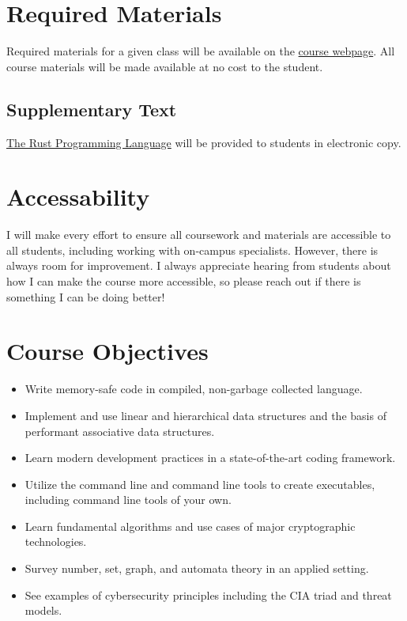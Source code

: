 \documentclass[11pt]{article}
\begin{document}
\section*{Required Materials}

Required materials for a given class will be available on the \href{https://cd-public.github.io/scicom}{course webpage}. All course materials will be made available at no cost to the student.

\subsection*{Supplementary Text}

\href{https://doc.rust-lang.org/book/}{The Rust Programming Language} will be provided to students in electronic copy.




\section*{Accessability}

I will make every effort to ensure all coursework and materials are accessible to all students, including working with on-campus specialists. However, there is always room for improvement. I always appreciate hearing from students about how I can make the course more accessible, so please reach out if there is something I can be doing better!


\section*{Course Objectives}

\begin{itemize}
\item Write memory-safe code in compiled, non-garbage collected language.
\item Implement and use linear and hierarchical data structures and the basis of performant associative data structures.
\item Learn modern development practices in a state-of-the-art coding framework.
\item Utilize the command line and command line tools to create executables, including command line tools of your own.
\item Learn fundamental algorithms and use cases of major cryptographic technologies.
\item Survey number, set, graph, and automata theory in an applied setting.
\item See examples of cybersecurity principles including the CIA triad and threat models.
\end{itemize}
\end{document}
